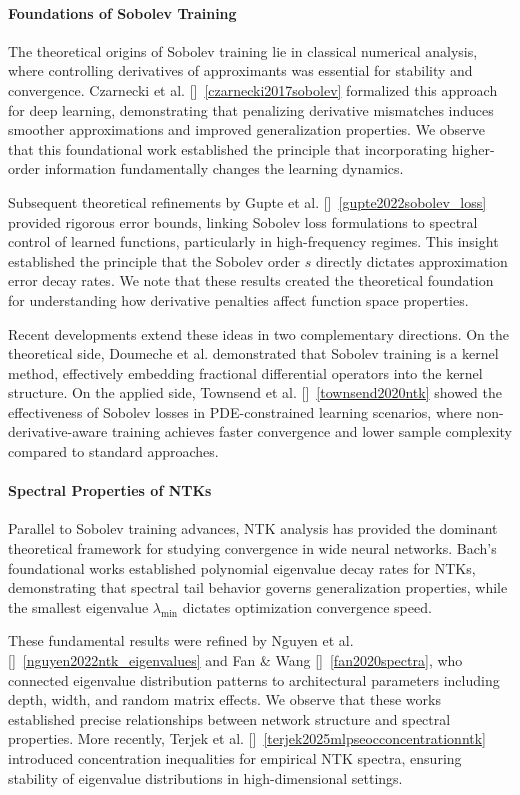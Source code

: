 \documentclass[a4paper]{article}
\theoremstyle{plain}
\theoremstyle{definition}
\theoremstyle{remark}
\begin{document}
\paragraph{Foundations of Sobolev Training}

The theoretical origins of Sobolev training lie in classical numerical analysis, where controlling derivatives of approximants was essential for stability and convergence. Czarnecki et al. []~\ref{czarnecki2017sobolev} formalized this approach for deep learning, demonstrating that penalizing derivative mismatches induces smoother approximations and improved generalization properties. We observe that this foundational work established the principle that incorporating higher-order information fundamentally changes the learning dynamics.

Subsequent theoretical refinements by Gupte et al. []~\ref{gupte2022sobolev_loss} provided rigorous error bounds, linking Sobolev loss formulations to spectral control of learned functions, particularly in high-frequency regimes. This insight established the principle that the Sobolev order $s$ directly dictates approximation error decay rates. We note that these results created the theoretical foundation for understanding how derivative penalties affect function space properties.

Recent developments extend these ideas in two complementary directions. On the theoretical side, Doumeche et al. demonstrated that Sobolev training is a kernel method, effectively embedding fractional differential operators into the kernel structure. On the applied side, Townsend et al. []~\ref{townsend2020ntk} showed the effectiveness of Sobolev losses in PDE-constrained learning scenarios, where non-derivative-aware training achieves faster convergence and lower sample complexity compared to standard approaches.

\paragraph{Spectral Properties of NTKs}

Parallel to Sobolev training advances, NTK analysis has provided the dominant theoretical framework for studying convergence in wide neural networks. Bach's foundational works established polynomial eigenvalue decay rates for NTKs, demonstrating that spectral tail behavior governs generalization properties, while the smallest eigenvalue $\lambda_{\min}$ dictates optimization convergence speed.

These fundamental results were refined by Nguyen et al. []~\ref{nguyen2022ntk_eigenvalues} and Fan \& Wang []~\ref{fan2020spectra}, who connected eigenvalue distribution patterns to architectural parameters including depth, width, and random matrix effects. We observe that these works established precise relationships between network structure and spectral properties. More recently, Terjek et al. []~\ref{terjek2025mlpseocconcentrationntk} introduced concentration inequalities for empirical NTK spectra, ensuring stability of eigenvalue distributions in high-dimensional settings.
\end{document}
